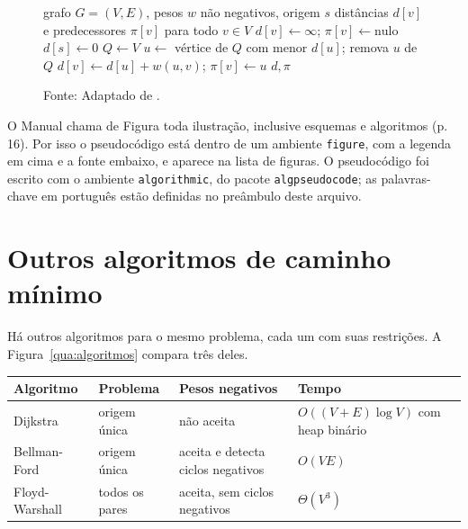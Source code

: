 \documentclass[tcc,capa]{texufpel}
\begin{document}
\begin{figure}[htbp]
  \caption{Pseudocódigo do algoritmo de Dijkstra}
  \label{fig:dijkstra}
  \begin{algorithmic}[1]
    \Require grafo $G = (V, E)$, pesos $w$ não negativos, origem $s$
    \Ensure distâncias $d[v]$ e predecessores $\pi[v]$ para todo $v \in V$
      \State $d[v] \gets \infty$; \quad $\pi[v] \gets \text{nulo}$
    \EndFor
    \State $d[s] \gets 0$
    \State $Q \gets V$ 
      \State $u \gets$ vértice de $Q$ com menor $d[u]$; remova $u$ de $Q$
          \State $d[v] \gets d[u] + w(u, v)$; \quad $\pi[v] \gets u$
        \EndIf
      \EndFor
    \EndWhile
    \State \Return $d, \pi$
  \end{algorithmic}
  \caption*{Fonte: Adaptado de \citet{Cormen:2022:IA}.}
\end{figure}

O Manual chama de Figura toda ilustração, inclusive esquemas e algoritmos
(p. 16). Por isso o pseudocódigo está dentro de um ambiente \texttt{figure},
com a legenda em cima e a fonte embaixo, e aparece na lista de figuras. O
pseudocódigo foi escrito com o ambiente \texttt{algorithmic}, do pacote
\texttt{algpseudocode}; as palavras-chave em português estão definidas no
preâmbulo deste arquivo.

\section{Outros algoritmos de caminho mínimo}
\label{sec:outros}

Há outros algoritmos para o mesmo problema, cada um com suas restrições. A
Figura~\ref{qua:algoritmos} compara três deles.

\begin{quadro}[htbp]
  \caption{Comparação entre algoritmos de caminho mínimo}
  \label{qua:algoritmos}
  \centering
  \begin{tabular}{|p{2.8cm}|p{2.6cm}|p{4.4cm}|p{4.2cm}|}
    \hline
    \textbf{Algoritmo} & \textbf{Problema} & \textbf{Pesos negativos} & \textbf{Tempo} \\ \hline
    Dijkstra       & origem única       & não aceita & $O((V + E) \log V)$ com heap binário \\ \hline
    Bellman-Ford   & origem única       & aceita e detecta ciclos negativos & $O(VE)$ \\ \hline
    Floyd-Warshall & todos os pares     & aceita, sem ciclos negativos & $\Theta(V^3)$ \\ \hline
  \end{tabular}
  \caption*{Fonte: Elaborado pela autora (2026), com base em \citet{Cormen:2022:IA}.}
\end{quadro}
\end{document}
